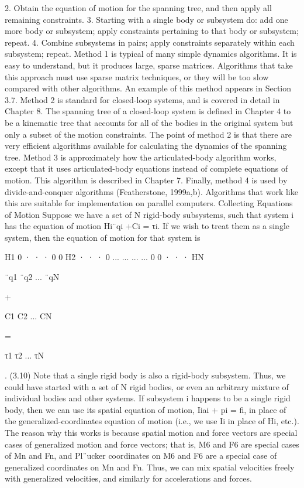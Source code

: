 2. Obtain the equation of motion for the spanning tree, and then apply all remaining constraints. 3. Starting with a single body or subsystem do: add one more body or subsystem; apply constraints pertaining to that body or subsystem; repeat. 4. Combine subsystems in pairs; apply constraints separately within each subsystem; repeat. Method 1 is typical of many simple dynamics algorithms. It is easy to understand, but it produces large, sparse matrices. Algorithms that take this approach must use sparse matrix techniques, or they will be too slow compared with other algorithms. An example of this method appears in Section 3.7. Method 2 is standard for closed-loop systems, and is covered in detail in Chapter 8. The spanning tree of a closed-loop system is defined in Chapter 4 to be a kinematic tree that accounts for all of the bodies in the original system but only a subset of the motion constraints. The point of method 2 is that there are very efficient algorithms available for calculating the dynamics of the spanning tree. Method 3 is approximately how the articulated-body algorithm works, except that it uses articulated-body equations instead of complete equations of motion. This algorithm is described in Chapter 7. Finally, method 4 is used by divide-and-conquer algorithms (Featherstone, 1999a,b). Algorithms that work like this are suitable for implementation on parallel computers. Collecting Equations of Motion Suppose we have a set of N rigid-body subsystems, such that system i has the equation of motion Hi¨qi +Ci = τi. If we wish to treat them as a single system, then the equation of motion for that system is

H1 0 · · · 0 0 H2 · · · 0 ... ... ... ... 0 0 · · · HN

¨q1 ¨q2 ... ¨qN

+

C1 C2 ... CN

=

τ1 τ2 ... τN

. (3.10) Note that a single rigid body is also a rigid-body subsystem. Thus, we could have started with a set of N rigid bodies, or even an arbitrary mixture of individual bodies and other systems. If subsystem i happens to be a single rigid body, then we can use its spatial equation of motion, Iiai + pi = fi, in place of the generalized-coordinates equation of motion (i.e., we use Ii in place of Hi, etc.). The reason why this works is because spatial motion and force vectors are special cases of generalized motion and force vectors; that is, M6 and F6 are special cases of Mn and Fn, and Pl¨ucker coordinates on M6 and F6 are a special case of generalized coordinates on Mn and Fn. Thus, we can mix spatial velocities freely with generalized velocities, and similarly for accelerations and forces.


